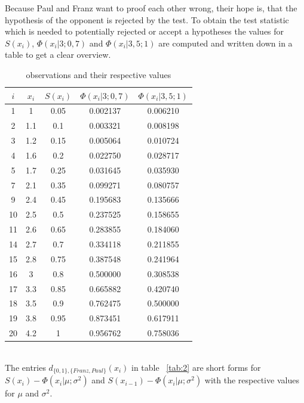 \documentclass{article}
\begin{document}
Because Paul and Franz want to proof each other wrong, their hope is, that the hypothesis of the opponent is rejected by the test.
To obtain the test statistic which is needed to potentially rejected or accept a hypotheses the values for $S(x_i)$, $\Phi (x_i|3;0,7)$ and $\Phi (x_i|3,5;1)$ are computed and written down in a table to get a clear overview.
\begin{table}[ht]
\caption{observations and their respective values}
\center
\begin{tabular}{c|c|c|c|c}
\label{tab:1}
$i$ 	& $x_i$ 	& $S(x_i)$ 	& $\Phi (x_i|3;0,7)$ 	& $\Phi (x_i|3,5;1)$ 	\\
\hline
1	&	1	&	0.05	&	0.002137	&	0.006210	\\
2	&	1.1	&	0.1	&	0.003321	&	0.008198	\\
3	&	1.2	&	0.15	&	0.005064	&	0.010724	\\
4	&	1.6	&	0.2	&	0.022750	&	0.028717	\\
5	&	1.7	&	0.25	&	0.031645	&	0.035930	\\
7	&	2.1	&	0.35	&	0.099271	&	0.080757	\\
9	&	2.4	&	0.45	&	0.195683	&	0.135666	\\
10	&	2.5	&	0.5	&	0.237525	&	0.158655	\\
11	&	2.6	&	0.65	&	0.283855	&	0.184060	\\
14	&	2.7	&	0.7	&	0.334118	&	0.211855	\\
15	&	2.8	&	0.75	&	0.387548	&	0.241964	\\
16	&	3	&	0.8	&	0.500000	&	0.308538	\\
17	&	3.3	&	0.85	&	0.665882	&	0.420740	\\
18	&	3.5	&	0.9	&	0.762475	&	0.500000	\\
19	&	3.8	&	0.95	&	0.873451	&	0.617911	\\
20	&	4.2	&	1	&	0.956762	&	0.758036	\\
\end{tabular}
\end{table}
\\
The entries $d_{\{0,1\},\{Franz,Paul\}}(x_i)$ in table ~\ref{tab:2} are short forms for $S(x_i)-\Phi (x_i|\mu ;\sigma^2)$ and $S(x_{i-1})-\Phi (x_i|\mu;\sigma^2)$ with the respective values for $\mu$ and $\sigma^2$.\\
\end{document}
